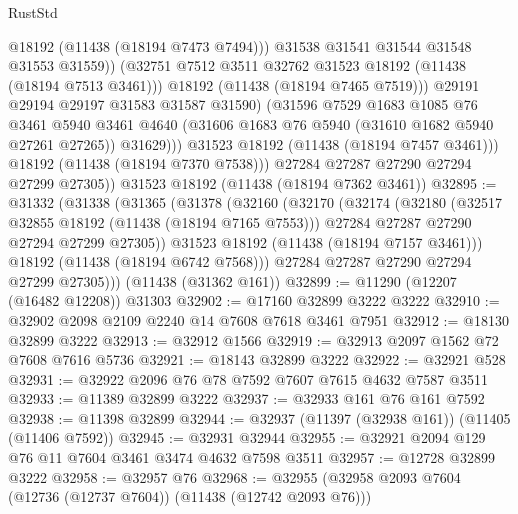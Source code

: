 \begin{lexlean}{RustStd}
\begin{coremodule}
                          @18192
                          (@11438 (@18194 @7473 @7494)))
                        @31538
                        @31541
                        @31544
                        @31548
                        @31553
                        @31559))
                    (@32751 @7512 @3511 @32762 @31523 @18192 (@11438 (@18194 @7513 @3461)))
                    @18192
                    (@11438 (@18194 @7465 @7519)))
                  @29191
                  @29194
                  @29197
                  @31583
                  @31587
                  @31590)
                (@31596
                  @7529
                  @1683
                  @1085
                  @76
                  @3461
                  @5940
                  @3461
                  @4640
                  (@31606 @1683 @76 @5940 (@31610 @1682 @5940 @27261 @27265))
                  @31629)))
            @31523
            @18192
            (@11438 (@18194 @7457 @3461)))
          @18192
          (@11438 (@18194 @7370 @7538)))
        @27284
        @27287
        @27290
        @27294
        @27299
        @27305))
    @31523
    @18192
    (@11438 (@18194 @7362 @3461))
@32895 := @31332
    (@31338
      (@31365
        (@31378
          (@32160
            (@32170
              (@32174
                (@32180
                  (@32517 @32855 @18192 (@11438 (@18194 @7165 @7553)))
                  @27284
                  @27287
                  @27290
                  @27294
                  @27299
                  @27305))
              @31523
              @18192
              (@11438 (@18194 @7157 @3461)))
            @18192
            (@11438 (@18194 @6742 @7568)))
          @27284
          @27287
          @27290
          @27294
          @27299
          @27305)))
    (@11438 (@31362 @161))
@32899 := @11290 (@12207 (@16482 @12208)) @31303
@32902 := @17160 @32899 @3222 @3222
@32910 := @32902 @2098 @2109 @2240 @14 @7608 @7618 @3461 @7951
@32912 := @18130 @32899 @3222
@32913 := @32912 @1566
@32919 := @32913 @2097 @1562 @72 @7608 @7616 @5736
@32921 := @18143 @32899 @3222
@32922 := @32921 @528
@32931 := @32922 @2096 @76 @78 @7592 @7607 @7615 @4632 @7587 @3511
@32933 := @11389 @32899 @3222
@32937 := @32933 @161 @76 @161 @7592
@32938 := @11398 @32899
@32944 := @32937 (@11397 (@32938 @161)) (@11405 (@11406 @7592))
@32945 := @32931 @32944
@32955 := @32921 @2094 @129 @76 @11 @7604 @3461 @3474 @4632 @7598 @3511
@32957 := @12728 @32899 @3222
@32958 := @32957 @76
@32968 := @32955 (@32958 @2093 @7604 (@12736 (@12737 @7604)) (@11438 (@12742 @2093 @76)))

\end{coremodule}
\end{lexlean}
